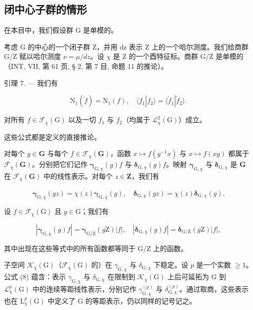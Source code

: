 \subsection{闭中心子群的情形}

在本目中，我们假设群 G 是单模的。

 考虑 G 的中心的一个闭子群 Z，并用 dz 表示 Z 上的一个哈尔测度。我们给商群 G/Z 赋以哈尔测度 \(\nu = \mu/dz\)。设 \(\chi\) 是 Z 的一个酉特征标。商群 G/Z 是单模的（INT, VII, 第 61 页, § 2, 第 7 目, 命题 11 的推论）。

引理 7. --- 我们有

\[
\mathrm{N} _ {1} (\check {f}) = \mathrm{N} _ {1} (f), \quad \langle f _ {1} | f _ {2} \rangle = \langle \check {f} _ {1} | \check {f} _ {2} \rangle .\tag{6}
\]

对所有 \(f \in \mathcal{F}_{\chi}(\mathrm{G})\) 以及一切 \(f_1\) 与 \(f_2\)（均属于 \(\mathcal{L}_{\chi}^{2}(\mathrm{G})\)）成立。

这些公式都是定义的直接推论。

 对每个 \(g \in \mathbf{G}\) 与每个 \(f \in \mathcal{F}_{\chi}(\mathbf{G})\)，函数 \(x \mapsto f(g^{-1}x)\) 与 \(x \mapsto f(xg)\) 都属于 \(\mathcal{F}_{\chi}(\mathbf{G})\)。分别把它们记作 \(\boldsymbol{\gamma}_{\mathrm{G},\chi}(g)f\) 与 \(\boldsymbol{\delta}_{\mathrm{G},\chi}(g)f\)。映射 \(\boldsymbol{\gamma}_{\mathrm{G},\chi}\) 与 \(\boldsymbol{\delta}_{\mathrm{G},\chi}\) 是 \(\mathbf{G}\) 在 \(\mathcal{F}_{\chi}(\mathbf{G})\) 中的线性表示。对每个 \(z \in \mathbf{Z}\)，我们有

\[
\boldsymbol {\gamma} _ {\mathrm{G}, \chi} (g z) = \overline {{\chi (z)}} \boldsymbol {\gamma} _ {\mathrm{G}, \chi} (g), \quad \boldsymbol {\delta} _ {\mathrm{G}, \chi} (g z) = \chi (z) \boldsymbol {\delta} _ {\mathrm{G}, \chi} (g).\tag{7}
\]

设 \(f\in \mathcal{F}_{\chi}(\mathrm{G})\) 且 \(g\in \mathrm{G}\)；我们有

\[
| \boldsymbol {\gamma} _ {\mathrm{G}, \chi} (g) f | = \boldsymbol {\gamma} _ {\mathrm{G} / \mathrm{Z}} (g \mathrm{Z}) | f |, \quad | \boldsymbol {\delta} _ {\mathrm{G}, \chi} (g) f | = \boldsymbol {\delta} _ {\mathrm{G} / \mathrm{Z}} (g \mathrm{Z}) | f |,\tag{8}
\]

其中出现在这些等式中的所有函数都等同于 G/Z 上的函数。

 子空间 \(\mathcal{K}_{\chi}(\mathrm{G})\)（\(\mathcal{F}_{\chi}(\mathrm{G})\) 的）在 \(\gamma_{\mathrm{G},\chi}\) 与 \(\delta_{\mathrm{G},\chi}\) 下稳定。设 \(p\) 是一个实数 \(\geqslant 1\)。公式 (8) 蕴含：表示 \(\gamma_{\mathrm{G},\chi}\) 与 \(\delta_{\mathrm{G},\chi}\) 在限制到 \(\mathcal{K}_{\chi}(\mathrm{G})\) 上后可延拓为 G 到 \(\mathcal{L}_{\chi}^{p}(\mathrm{G})\) 中的连续等距线性表示，分别记作 \(\gamma_{\mathrm{G},\chi}^{(p)}\) 与 \(\delta_{\mathrm{G},\chi}^{(p)}\)。通过取商，这些表示也在 \(\mathrm{L}_{\chi}^{p}(\mathrm{G})\) 中定义了 G 的等距表示，仍以同样的记号记之。

